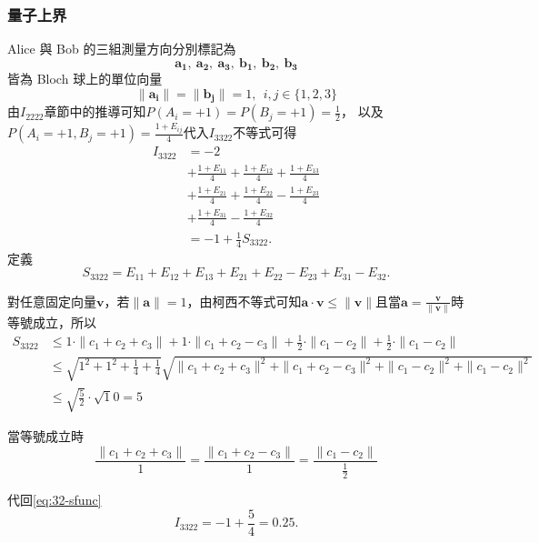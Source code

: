 \documentclass[12pt, a4paper, twoside, reqno]{article}
\begin{document}
\subsubsection{量子上界}
Alice 與 Bob 的三組測量方向分別標記為
\[
    \bm{a_1},~\bm{a_2},~\bm{a_3},~\bm{b_1},~\bm{b_2},~\bm{b_3}
\]
\noindent 皆為 Bloch 球上的單位向量
\[
    \|\bm{a_i}\| = \|\bm{b_j}\| = 1,~~i,j\in\{1,2,3\}
\]
\noindent 由$I_{2222}$章節中的推導可知$P(A_i = +1) = P(B_j = +1) = \frac{1}{2}$，
以及$P(A_i=+1,B_j=+1) = \frac{1+E_{ij}}{4}$代入$I_{3322}$不等式可得
\begin{equation}
    \begin{aligned}
        I_{3322}
        &=-2\\
        &+\frac{1+E_{11}}{4}+\frac{1+E_{12}}{4}+\frac{1+E_{13}}{4}\\
        &+\frac{1+E_{21}}{4}+\frac{1+E_{22}}{4}-\frac{1+E_{23}}{4}\\
        &+\frac{1+E_{31}}{4}-\frac{1+E_{32}}{4}\\
        &=-1+\frac{1}{4}S_{3322}.
        \label{eq:32-sfunc}
    \end{aligned}
\end{equation}
\noindent 定義
\begin{equation}
    S_{3322} = E_{11}+E_{12}+E_{13}+E_{21}+E_{22}-E_{23}+E_{31}-E_{32}.
    \label{I3322-Sfunc}
\end{equation}

\noindent 對任意固定向量$\bm{v}$，若$\|\bm{a}\|=1$，由柯西不等式可知$\bm{a}\cdot\bm{v}\leq\|\bm{v}\|$且當$\bm{a}=\frac{\bm{v}}{\|\bm{v}\|}$時等號成立，所以
\begin{equation}
\begin{aligned}
     S_{3322} &\leq 1\cdot\|c_1+c_2+c_3\|+1\cdot\|c_1+c_2-c_3\|+\frac{1}{2}\cdot\|c_1-c_2\|+\frac{1}{2}\cdot\|c_1-c_2\|\\
     &\leq \sqrt{1^2+1^2+\frac{1}{4}+\frac{1}{4}}\sqrt{\|c_1+c_2+c_3\|^2+\|c_1+c_2-c_3\|^2+\|c_1-c_2\|^2+\|c_1-c_2\|^2}\\
     &\leq\sqrt{\frac{5}{2}}\cdot\sqrt10=5
\end{aligned}
\end{equation}

\noindent 當等號成立時
\[
    \frac{\|c_1+c_2+c_3\|}{1}=\frac{\|c_1+c_2-c_3\|}{1}=\frac{\|c_1-c_2\|}{\frac{1}{2}}    
    \]

\noindent 代回\eqref{eq:32-sfunc}
\begin{equation}
    I_{3322}
    =
    -1+\frac{5}{4}=0.25.
    \label{eq:I3322-S3322-relation}
\end{equation}
\end{document}
